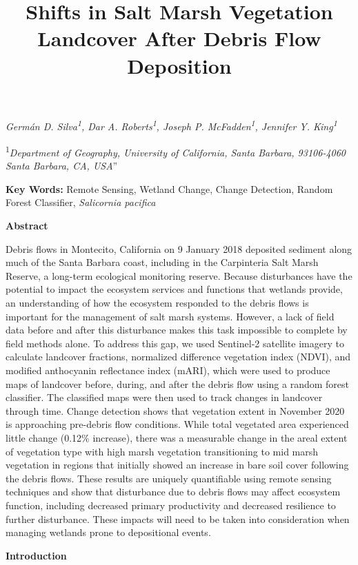\documentclass[
]{article}
\title{Shifts in Salt Marsh Vegetation Landcover After Debris Flow
Deposition}
\author{}
\date{\vspace{-2.5em}}
\begin{document}
\maketitle

\emph{Germán D. Silva\textsuperscript{1}, Dar A.
Roberts\textsuperscript{1}, Joseph P. McFadden\textsuperscript{1},
Jennifer Y. King\textsuperscript{1}}

\textsuperscript{1}\emph{Department of Geography, University of
California, Santa Barbara, 93106-4060 Santa Barbara, CA, USA}''

\textbf{Key Words:} Remote Sensing, Wetland Change, Change Detection,
Random Forest Classifier, \emph{Salicornia pacifica}

\textbf{Abstract}

Debris flows in Montecito, California on 9 January 2018 deposited
sediment along much of the Santa Barbara coast, including in the
Carpinteria Salt Marsh Reserve, a long-term ecological monitoring
reserve. Because disturbances have the potential to impact the ecosystem
services and functions that wetlands provide, an understanding of how
the ecosystem responded to the debris flows is important for the
management of salt marsh systems. However, a lack of field data before
and after this disturbance makes this task impossible to complete by
field methods alone. To address this gap, we used Sentinel-2 satellite
imagery to calculate landcover fractions, normalized difference
vegetation index (NDVI), and modified anthocyanin reflectance index
(mARI), which were used to produce maps of landcover before, during, and
after the debris flow using a random forest classifier. The classified
maps were then used to track changes in landcover through time. Change
detection shows that vegetation extent in November 2020 is approaching
pre-debris flow conditions. While total vegetated area experienced
little change (0.12\% increase), there was a measurable change in the
areal extent of vegetation type with high marsh vegetation transitioning
to mid marsh vegetation in regions that initially showed an increase in
bare soil cover following the debris flows. These results are uniquely
quantifiable using remote sensing techniques and show that disturbance
due to debris flows may affect ecosystem function, including decreased
primary productivity and decreased resilience to further disturbance.
These impacts will need to be taken into consideration when managing
wetlands prone to depositional events.

\textbf{Introduction}
\end{document}
